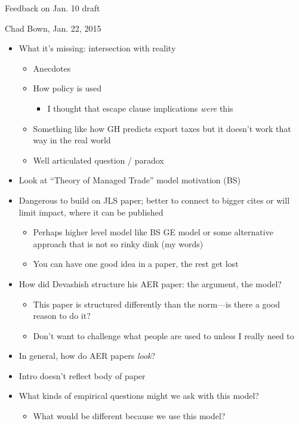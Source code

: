 \documentclass[12pt]{article}
\begin{document}
\begin{center}
Feedback on Jan. 10 draft
\end{center}

Chad Bown, Jan. 22, 2015
\begin{itemize}
	\item What it's missing: intersection with reality
		\begin{itemize}
			\item Anecdotes
			\item How policy is used
				\begin{itemize}
					\item I thought that escape clause implications \textit{were} this
				\end{itemize}
			\item Something like how GH predicts export taxes but it doesn't work that way in the real world
			\item Well articulated question / paradox
		\end{itemize}
	\item Look at ``Theory of Managed Trade'' model motivation (BS)
	\item Dangerous to build on JLS paper; better to connect to bigger cites or will limit impact, where it can be published
		\begin{itemize}
			\item Perhaps higher level model like BS GE model or some alternative approach that is not so rinky dink (my words)
			\item You can have one good idea in a paper, the rest get lost
		\end{itemize}
	\item How did Devashish structure his AER paper: the argument, the model?
		\begin{itemize}
			\item This paper is structured differently than the norm---is there a good reason to do it?
			\item Don't want to challenge what people are used to unless I really need to
		\end{itemize}
	\item In general, how do AER papers \textit{look}?
	\item Intro doesn't reflect body of paper
	\item What kinds of empirical questions might we ask with this model?
		\begin{itemize}
			\item What would be different because we use this model?
		\end{itemize}
\end{itemize}
\end{document}
